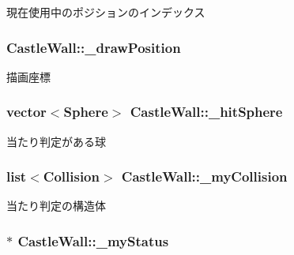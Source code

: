 現在使用中のポジションのインデックス 

\hypertarget{class_castle_wall_a4c7b392af8d00109092f17cbe169b8e8}{
\subsubsection[{\-\_\-draw\-Position}]{ Castle\-Wall\-::\-\_\-draw\-Position\hspace{0.3cm}{\ttfamily [protected]}}}\label{class_castle_wall_a4c7b392af8d00109092f17cbe169b8e8}


描画座標 

\hypertarget{class_castle_wall_a3223b9046a9d01b1fd952d2ecc1a8c40}{
\subsubsection[{\-\_\-hit\-Sphere}]{\setlength{\rightskip}{0pt plus 5cm}vector$<${\bf Sphere}$>$ Castle\-Wall\-::\-\_\-hit\-Sphere\hspace{0.3cm}{\ttfamily [protected]}}}\label{class_castle_wall_a3223b9046a9d01b1fd952d2ecc1a8c40}


当たり判定がある球 

\hypertarget{class_castle_wall_ab84bd40d05f9cb90506602216c0ac3d2}{
\subsubsection[{\-\_\-my\-Collision}]{\setlength{\rightskip}{0pt plus 5cm}list$<${\bf Collision}$>$ Castle\-Wall\-::\-\_\-my\-Collision\hspace{0.3cm}{\ttfamily [protected]}}}\label{class_castle_wall_ab84bd40d05f9cb90506602216c0ac3d2}


当たり判定の構造体 

\hypertarget{class_castle_wall_abc6fe65d816aa28f713ed6a5cd3fc2b2}{
\subsubsection[{\-\_\-my\-Status}]{$\ast$ Castle\-Wall\-::\-\_\-my\-Status\hspace{0.3cm}{\ttfamily [protected]}}}\label{class_castle_wall_abc6fe65d816aa28f713ed6a5cd3fc2b2}


